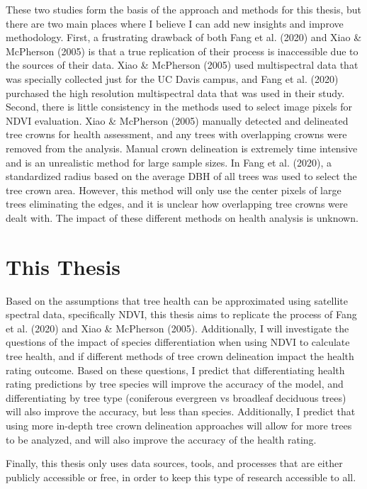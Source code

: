 \documentclass[12pt,twoside]{reedthesis}
\begin{document}
These two studies form the basis of the approach and methods for this
thesis, but there are two main places where I believe I can add new
insights and improve methodology. First, a frustrating drawback of both
Fang et al. (2020) and Xiao \& McPherson (2005) is that a true replication of their process is
inaccessible due to the sources of their data. Xiao \& McPherson (2005) used
multispectral data that was specially collected just for the UC Davis
campus, and Fang et al. (2020) purchased the high resolution multispectral data
that was used in their study. Second, there is little consistency in the
methods used to select image pixels for NDVI evaluation. Xiao \& McPherson (2005)
manually detected and delineated tree crowns for health assessment, and
any trees with overlapping crowns were removed from the analysis. Manual
crown delineation is extremely time intensive and is an unrealistic
method for large sample sizes. In Fang et al. (2020), a standardized radius based
on the average DBH of all trees was used to select the tree crown area.
However, this method will only use the center pixels of large trees
eliminating the edges, and it is unclear how overlapping tree crowns
were dealt with. The impact of these different methods on health
analysis is unknown.

\hypertarget{this-thesis}{%
\section{This Thesis}\label{this-thesis}}

Based on the assumptions that tree health can be approximated using
satellite spectral data, specifically NDVI, this thesis aims to
replicate the process of Fang et al. (2020) and Xiao \& McPherson (2005). Additionally, I will
investigate the questions of the impact of species differentiation when
using NDVI to calculate tree health, and if different methods of tree
crown delineation impact the health rating outcome. Based on these
questions, I predict that differentiating health rating predictions by
tree species will improve the accuracy of the model, and differentiating
by tree type (coniferous evergreen vs broadleaf deciduous trees) will
also improve the accuracy, but less than species. Additionally, I
predict that using more in-depth tree crown delineation approaches will
allow for more trees to be analyzed, and will also improve the accuracy
of the health rating.

Finally, this thesis only uses data sources, tools, and processes that
are either publicly accessible or free, in order to keep this type of
research accessible to all.
\end{document}
